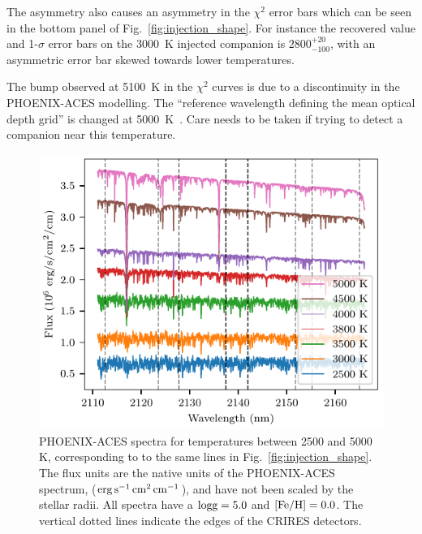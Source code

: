 \documentclass[fleqn,usenatbib]{mnras}
\begin{document}
    The asymmetry also causes an asymmetry in the \(\chi^2\) error bars which can be seen in the bottom panel of Fig.~\ref{fig:injection_shape}. For instance the recovered value and 1-\(\sigma\) error bars on the 3000~K injected companion is \(2800 ^{+20}_{-100}\), with an asymmetric error bar skewed towards lower temperatures.
    
    The bump observed at 5100~K in the \(\chi^2\) curves is due to a discontinuity in the PHOENIX-ACES modelling. The ``reference wavelength defining the mean optical depth grid'' is changed at 5000~K~\citep[][Sect. 2.3]{husser_new_2013}. Care needs to be taken if trying to detect a companion near this temperature.
    
    \begin{figure}
        \centering
        \includegraphics[width=0.95\hsize]{images/fig9.pdf}
        \caption{PHOENIX-ACES spectra for temperatures between 2500 and 5000 K, corresponding to to the same lines in Fig.~\ref{fig:injection_shape}. The flux units are the native units of the PHOENIX-ACES spectrum, (\(\rm erg\,s^{-1}\,cm^{2}\,cm^{-1}\)), and have not been scaled by the stellar radii. All spectra have a \(\rm logg=5.0\) and \(\rm [Fe/H]=0.0\). The vertical dotted lines indicate the edges of the CRIRES detectors.}
        \label{fig:comp_spectra}
    \end{figure}
    
\end{document}
